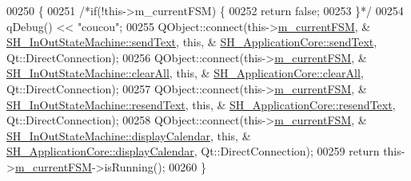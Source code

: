 \begin{DoxyCode}
00250 \{
00251     \textcolor{comment}{/*if(!this->m\_currentFSM) \{}
00252 \textcolor{comment}{        return false;}
00253 \textcolor{comment}{    \}*/}
00254     qDebug() << \textcolor{stringliteral}{"coucou"};
00255     QObject::connect(this->\hyperlink{classSH__ApplicationCore_a1088f3ba13abb8b3989cc0c325524232}{m\_currentFSM}, &
      \hyperlink{classSH__InOutStateMachine_ae2cbbe3cd207158668dcb4838938c7ad}{SH\_InOutStateMachine::sendText}, \textcolor{keyword}{this}, &
      \hyperlink{classSH__ApplicationCore_ac70121669e6133e84b0b8266b09b9199}{SH\_ApplicationCore::sendText}, Qt::DirectConnection);
00256         QObject::connect(this->\hyperlink{classSH__ApplicationCore_a1088f3ba13abb8b3989cc0c325524232}{m\_currentFSM}, &
      \hyperlink{classSH__InOutStateMachine_ad722deb53285919796b04db5af6e51b4}{SH\_InOutStateMachine::clearAll}, \textcolor{keyword}{this}, &
      \hyperlink{classSH__ApplicationCore_a5f60ca485028cf56d9d56f7e80685f10}{SH\_ApplicationCore::clearAll}, Qt::DirectConnection);
00257         QObject::connect(this->\hyperlink{classSH__ApplicationCore_a1088f3ba13abb8b3989cc0c325524232}{m\_currentFSM}, &
      \hyperlink{classSH__InOutStateMachine_a526822c66b46aa0cd81ba4473fa5573f}{SH\_InOutStateMachine::resendText}, \textcolor{keyword}{this}, &
      \hyperlink{classSH__ApplicationCore_a5eb6c04758ff47330a8249da2b3265f2}{SH\_ApplicationCore::resendText}, Qt::DirectConnection);
00258     QObject::connect(this->\hyperlink{classSH__ApplicationCore_a1088f3ba13abb8b3989cc0c325524232}{m\_currentFSM}, &
      \hyperlink{classSH__InOutStateMachine_a0d241868828cbf9798233a8c74c69851}{SH\_InOutStateMachine::displayCalendar}, \textcolor{keyword}{this}, &
      \hyperlink{classSH__ApplicationCore_a7236456c901a089ca6e5735ec7e5da03}{SH\_ApplicationCore::displayCalendar}, Qt::DirectConnection);
00259     \textcolor{keywordflow}{return} this->\hyperlink{classSH__ApplicationCore_a1088f3ba13abb8b3989cc0c325524232}{m\_currentFSM}->isRunning();
00260 \}
\end{DoxyCode}
